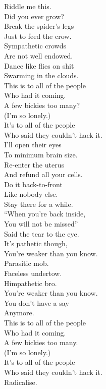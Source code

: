 

Riddle me this. \\
Did you ever grow? \\
Break the spider's legs \\
Just to feed the crow. \\
Sympathetic crowds \\
Are not well endowed. \\
Dance like flies on shit \\
Swarming in the clouds. \\

This is to all of the people \\
Who had it coming. \\
A few bickies too many? \\
(I'm so lonely.) \\
It's to all of the people \\
Who said they couldn't hack it. \\
I'll open their eyes \\

To minimum brain size. \\

Re-enter the uterus \\
And refund all your cells. \\
Do it back-to-front \\
Like nobody else. \\
Stay there for a while. \\
``When you're back inside, \\
You will not be missed'' \\
Said the tear to the eye. \\

It's pathetic though, \\
You're weaker than you know. \\
Parasitic mob. \\
Faceless undertow. \\
Himpathetic bro. \\
You're weaker than you know. \\
You don't have a say \\
Anymore. \\

This is to all of the people \\
Who had it coming. \\
A few bickies too many. \\
(I'm so lonely.) \\
It's to all of the people \\
Who said they couldn't hack it. \\
Radicalise. \\


